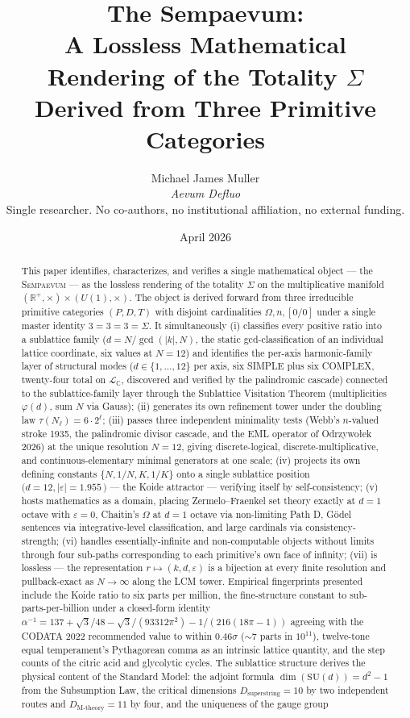 \documentclass[11pt,a4paper]{article}
\title{\bfseries The Sempaevum:\\[2pt]
A Lossless Mathematical Rendering of the Totality $\Sigma$\\[2pt]
Derived from Three Primitive Categories}
\author{Michael James Muller\\
\small\textit{Aevum Defluo}\\[2pt]
\small Single researcher. No co-authors, no institutional affiliation, no external funding.}
\date{April 2026}
\theoremstyle{definition}
\theoremstyle{remark}
\newcommand{\R}{\mathbb{R}}
\newcommand{\C}{\mathbb{C}}
\newcommand{\Sempaevum}{\textnormal{\textsc{Sempaevum}}}
\begin{document}
\maketitle

\begin{abstract}
\noindent
This paper identifies, characterizes, and verifies a single mathematical object — the \Sempaevum{} — as the lossless rendering of the totality $\Sigma$ on the multiplicative manifold $(\R^{+},\times) \times (U(1),\times)$. The object is derived forward from three irreducible primitive categories $(P,D,T)$ with disjoint cardinalities $\Omega, n, [0/0]$ under a single master identity $3=3=3=\Sigma$. It simultaneously (i) classifies every positive ratio into a sublattice family ($d = N/\gcd(|k|,N)$, the static gcd-classification of an individual lattice coordinate, six values at $N=12$) and identifies the per-axis harmonic-family layer of structural modes ($d \in \{1,\ldots,12\}$ per axis, six SIMPLE plus six COMPLEX, twenty-four total on $\mathcal{L}_{\C}$, discovered and verified by the palindromic cascade) connected to the sublattice-family layer through the Sublattice Visitation Theorem (multiplicities $\varphi(d)$, sum $N$ via Gauss); (ii) generates its own refinement tower under the doubling law $\tau(N_{\ell}) = 6 \cdot 2^{\ell}$; (iii) passes three independent minimality tests (Webb's $n$-valued stroke 1935, the palindromic divisor cascade, and the EML operator of Odrzywołek 2026) at the unique resolution $N=12$, giving discrete-logical, discrete-multiplicative, and continuous-elementary minimal generators at one scale; (iv) projects its own defining constants $\{N, 1/N, K, 1/K\}$ onto a single sublattice position $(d=12, |\varepsilon|=1.955$\,\textcent$)$ — the Koide attractor — verifying itself by self-consistency; (v) hosts mathematics as a domain, placing Zermelo--Fraenkel set theory exactly at $d=1$ octave with $\varepsilon=0$, Chaitin's $\Omega$ at $d=1$ octave via non-limiting Path D, Gödel sentences via integrative-level classification, and large cardinals via consistency-strength; (vi) handles essentially-infinite and non-computable objects without limits through four sub-paths corresponding to each primitive's own face of infinity; (vii) is lossless — the representation $r \mapsto (k,d,\varepsilon)$ is a bijection at every finite resolution and pullback-exact as $N \to \infty$ along the LCM tower. Empirical fingerprints presented include the Koide ratio to six parts per million, the fine-structure constant to sub-parts-per-billion under a closed-form identity $\alpha^{-1} = 137 + \sqrt{3}/48 - \sqrt{3}/(93312\pi^{2}) - 1/(216(18\pi-1))$ agreeing with the CODATA 2022 recommended value to within $0.46\sigma$ ($\sim 7$ parts in $10^{11}$), twelve-tone equal temperament's Pythagorean comma as an intrinsic lattice quantity, and the step counts of the citric acid and glycolytic cycles. The sublattice structure derives the physical content of the Standard Model: the adjoint formula $\dim(\mathrm{SU}(d)) = d^{2}-1$ from the Subsumption Law, the critical dimensions $D_{\mathrm{superstring}} = 10$ by two independent routes and $D_{\mathrm{M\text{-}theory}} = 11$ by four, and the uniqueness of the gauge group 
\end{abstract}
\end{document}
